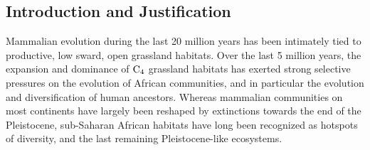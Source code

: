 \documentclass[11pt]{article}
\begin{document}
\printfigures
\figmarkon


\renewcommand{\figurename}{Fig}
\setlength{\parindent}{0.3in}
\setlength{\parskip}{1pt}

\rhead[\thesection]{}%

\cfoot[\thepage]{\thepage}
\lfoot[\thepage]{}





\subsection*{\large \textbf{Introduction and Justification}}\vspace{-2mm}


Mammalian evolution during the last 20 million years has been intimately tied to productive, low sward, open grassland habitats.
Over the last 5 million years, the expansion and dominance of $\rm C_4$ grassland habitats has exerted strong selective pressures on the evolution of African communities, and in particular the evolution and diversification of human ancestors.
Whereas mammalian communities on most continents have largely been reshaped by extinctions towards the end of the Pleistocene, sub-Saharan African habitats have long been recognized as hotspots of diversity, and the last remaining Pleistocene-like ecosystems.
\end{document}
